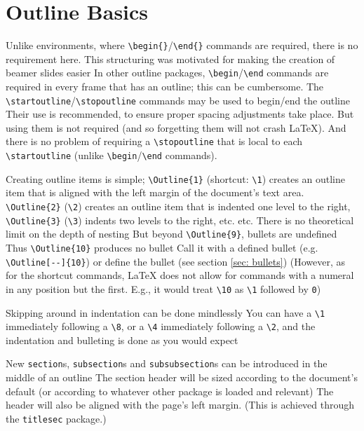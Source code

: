 \documentclass[11pt]{article}
\begin{document}
\section{Outline Basics}\label{sec: basics}
\1 Unlike environments, where \verb+\begin{}+/\verb+\end{}+ commands are required, there is no requirement here.
	\2 This structuring was motivated for making the creation of beamer slides easier
		\3 In other outline packages, \verb+\begin+/\verb+\end+ commands are required in every frame that has an outline; this can be cumbersome. 
	\2 The \verb+\startoutline+/\verb+\stopoutline+ commands may be used to begin/end the outline
		\3 Their use is recommended, to ensure proper spacing adjustments take place.
		\3 But using them is not required (and so forgetting them will not crash \LaTeX).
		\3 And there is no problem of requiring a \verb+\stopoutline+ that is local to each \verb+\startoutline+ (unlike \verb+\begin+/\verb+\end+ commands).

\1 Creating outline items is simple; \verb+\Outline{1}+ (shortcut: \verb+\1+) creates an outline item that is aligned with the left margin of the document's text area.
	\2 \verb+\Outline{2}+ (\verb+\2+) creates an outline item that is indented one level to the right, \verb+\Outline{3}+ (\verb+\3+) indents two levels to the right, etc. etc.
	\2 There is no theoretical limit on the depth of nesting
	\2 But beyond \verb+\Outline{9}+, bullets are undefined
		\3 Thus \verb+\Outline{10}+ produces no bullet
			\4 Call it with a defined bullet (e.g. \verb+\Outline[--]{10}+) or define the bullet (see section \ref{sec: bullets})
	\2 (However, as for the shortcut commands, \LaTeX{} does not allow for commands with a numeral in any position but the first. E.g., it would treat \verb+\10+ as \verb+\1+ followed by \verb+0+)

\1 Skipping around in indentation can be done mindlessly
	\2 You can have a \verb+\1+ immediately following a \verb+\8+, or a \verb+\4+ immediately following a \verb+\2+, and the indentation and bulleting is done as you would expect

\1 New \verb+section+s, \verb+subsection+s and \verb+subsubsection+s can be introduced in the middle of an outline
	\2 The section header will be sized according to the document's default (or according to whatever other package is loaded and relevant)
	\2 The header will also be aligned with the page's left margin.  (This is achieved through the \verb+titlesec+ package.)
\end{document}
